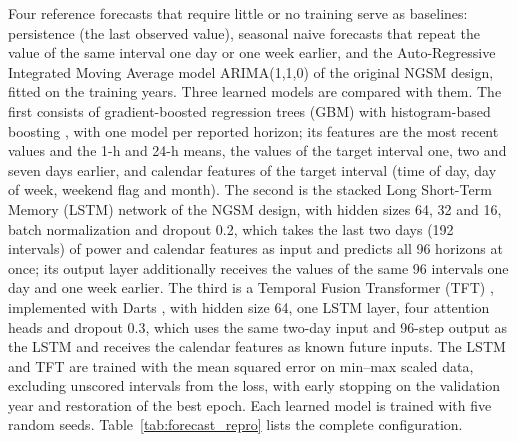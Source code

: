 Four reference forecasts that require little or no training serve as baselines: persistence (the last observed value), seasonal naive forecasts that repeat the value of the same interval one day or one week earlier, and the Auto-Regressive Integrated Moving Average model ARIMA(1,1,0) of the original NGSM design, fitted on the training years. Three learned models are compared with them. The first consists of gradient-boosted regression trees (GBM) with histogram-based boosting \cite{Ke2017lightgbm, Pedregosa2011sklearn}, with one model per reported horizon; its features are the most recent values and the 1-h and 24-h means, the values of the target interval one, two and seven days earlier, and calendar features of the target interval (time of day, day of week, weekend flag and month). The second is the stacked Long Short-Term Memory (LSTM) network of the NGSM design, with hidden sizes 64, 32 and 16, batch normalization and dropout 0.2, which takes the last two days (192 intervals) of power and calendar features as input and predicts all 96 horizons at once; its output layer additionally receives the values of the same 96 intervals one day and one week earlier. The third is a Temporal Fusion Transformer (TFT) \cite{Lim2021tft}, implemented with Darts \cite{Herzen2022darts}, with hidden size 64, one LSTM layer, four attention heads and dropout 0.3, which uses the same two-day input and 96-step output as the LSTM and receives the calendar features as known future inputs. The LSTM and TFT are trained with the mean squared error on min--max scaled data, excluding unscored intervals from the loss, with early stopping on the validation year and restoration of the best epoch. Each learned model is trained with five random seeds. Table~\ref{tab:forecast_repro} lists the complete configuration.

